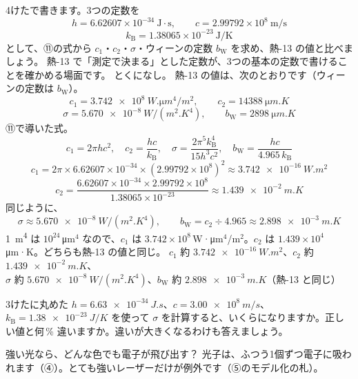 \label{ph:原-2:ex12}
\begin{phreidai}
4けたで書きます。3つの定数を
\[ h=6.62607\times10^{-34}\ \mathrm{J\cdot s},\qquad c=2.99792\times10^{8}\ \mathrm{m/s} \]
\[ k_{\mathrm B}=1.38065\times10^{-23}\ \mathrm{J/K} \]
として、⑪の式から $c_1$・$c_2$・$\sigma$・ウィーンの定数 $b_{\mathrm W}$ を求め、熱-13 の値と比べましょう。
\phbamen
熱-13 で「測定で決まる」とした定数が、3つの基本の定数で書けることを確かめる場面です。
\phmushi
とくになし。
\phzu
熱-13 の値は、次のとおりです（ウィーンの定数は $b_{\mathrm W}$）。
\[ c_1=\qty{3.742e8}{W.\micro m^4/m^2},\qquad c_2=\qty{14388}{\micro m.K} \]
\[ \sigma=\qty{5.670e-8}{W/(m^2.K^4)},\qquad b_{\mathrm W}=\qty{2898}{\micro m.K} \]
\phriyu
⑪で導いた式。
\phtateru
\[ c_1=2\pi hc^2,\quad c_2=\frac{hc}{k_{\mathrm B}},\quad\sigma=\frac{2\pi^5k_{\mathrm B}^4}{15h^3c^2},\quad b_{\mathrm W}=\frac{hc}{4.965\,k_{\mathrm B}} \]
\phtoku
\[ c_1=2\pi\times6.62607\times10^{-34}\times(2.99792\times10^8)^2\approx\qty{3.742e-16}{W.m^2} \]
\[ c_2=\frac{6.62607\times10^{-34}\times2.99792\times10^8}{1.38065\times10^{-23}}\approx\qty{1.439e-2}{m.K} \]
同じように、
\[ \sigma\approx\qty{5.670e-8}{W/(m^2.K^4)},\qquad b_{\mathrm W}=c_2\div4.965\approx\qty{2.898e-3}{m.K} \]
\phtashikame
\qty{1}{m^4} は $10^{24}$\,\unit{\micro m}$^4$ なので、$c_1$ は $3.742\times10^8$\,W·\unit{\micro m}$^4$/m$^2$。$c_2$ は $1.439\times10^{4}$\,\unit{\micro m}·K。どちらも熱-13 の値と同じ。
\kotae $c_1$ 約 $\qty{3.742e-16}{W.m^2}$、$c_2$ 約 $\qty{1.439e-2}{m.K}$、\\
$\sigma$ 約 $\qty{5.670e-8}{W/(m^2.K^4)}$、$b_{\mathrm W}$ 約 $\qty{2.898e-3}{m.K}$（熱-13 と同じ）
\end{phreidai}
\begin{jibun}
3けたに丸めた $h=\qty{6.63e-34}{J.s}$、$c=\qty{3.00e8}{m/s}$、$k_{\mathrm B}=\qty{1.38e-23}{J/K}$ を使って $\sigma$ を計算すると、いくらになりますか。正しい値と何\,\% 違いますか。違いが大きくなるわけも答えましょう。
\end{jibun}

\begin{tsumazuki}{強い光なら、どんな色でも電子が飛び出す？}
光子は、ふつう1個ずつ電子に吸われます（④）。とても強いレーザーだけが例外です（⑤のモデル化の札）。
\end{tsumazuki}

